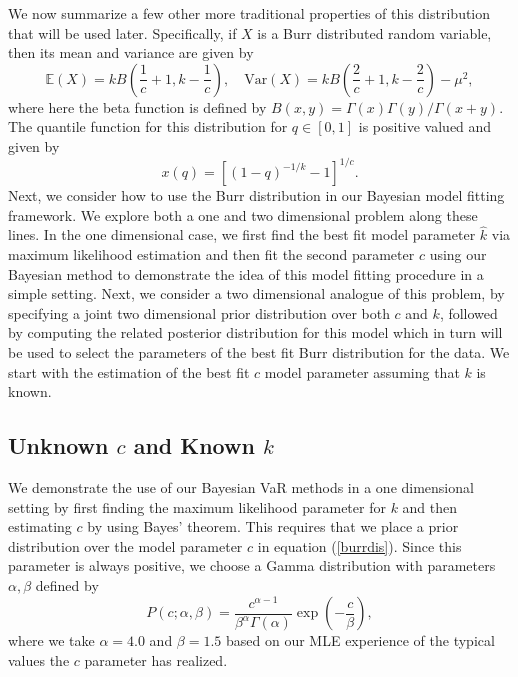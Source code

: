 \documentclass{amsart}
\begin{document}
We now summarize a few other more traditional properties of this distribution that 
will be used later.  Specifically, if $X$ is a Burr distributed random 
variable, then its mean and variance are given by
%
\begin{equation}
    \mathbb{E}(X) = k B\left(\frac{1}{c} + 1, k-\frac{1}{c}\right), 
    \quad \mathrm{Var}(X) = k B\left(\frac{2}{c}+1,k-\frac{2}{c}\right)-\mu^2, 
\end{equation}
where here the beta function is defined by  $B(x,y)=\Gamma(x)\Gamma(y)/\Gamma(x+y)$. 
The  quantile function for this distribution for $q\in[0,1]$ is positive valued and 
given by
%
\begin{equation}
    x(q) = \left[(1 - q)^{-1/k} - 1\right]^{1/c}.
    \label{burrquant}
\end{equation}
%
Next, we consider how to use the Burr distribution in our Bayesian model fitting 
framework. We explore both a one and two dimensional problem along these lines. 
In the one dimensional case, we first find the best fit model parameter $\hat{k}$ 
via maximum likelihood estimation and then
fit the second parameter $c$ using our Bayesian method to demonstrate the idea of this 
model fitting procedure in a simple setting.  Next, we consider a two 
dimensional analogue of this problem, by specifying a joint two dimensional prior distribution 
over both  $c$ and $k$, followed by computing the related posterior distribution for this model which in 
turn will be used to select the parameters of the 
best fit Burr distribution for the data.  We start with the 
estimation of the best fit $c$ model parameter assuming that $k$ is known. 

\subsection{Unknown $c$ and Known $k$}

We demonstrate the use of our Bayesian VaR methods in a one dimensional 
setting by first finding the maximum likelihood parameter 
for $k$ and then estimating $c$ by using Bayes' theorem.  
This requires that we 
place a prior distribution over the model parameter $c$ in equation (\ref{burrdis}).
Since this parameter is always positive, we choose 
a Gamma distribution with parameters $\alpha,\beta$ defined by
%
\begin{equation}
    P(c; \alpha,\beta) = \frac{c^{\alpha-1}}{\beta^\alpha\Gamma(\alpha)}
    \exp\left(-\frac{c}{\beta}\right), \label{bpri} 
\end{equation}
%
where we take $\alpha = 4.0$ and $\beta = 1.5$ based on our MLE experience of the typical 
values the $c$ parameter has realized. 
\end{document}
